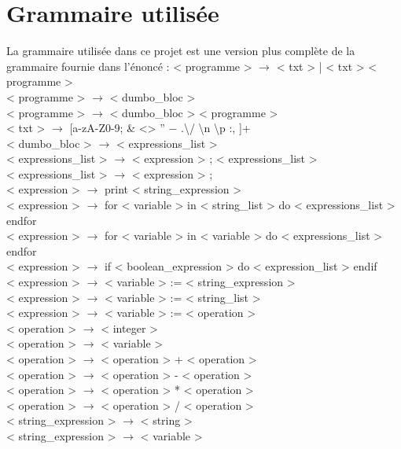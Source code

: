 \documentclass[a4paper,10pt]{article}
\begin{document}
\section{Grammaire utilisée}
La grammaire utilisée dans ce projet est une version plus complète de la grammaire fournie dans l'énoncé :\newline
{\small
< programme > $\rightarrow$ < txt > | < txt > < programme >\\
< programme > $\rightarrow$ < dumbo\_bloc > \\
< programme > $\rightarrow$ < dumbo\_bloc > < programme > \\
< txt > $\rightarrow$ [a-zA-Z0-9; \& <> ” − .\textbackslash / \textbackslash n \textbackslash p :, ]+ \\
< dumbo\_bloc > $\rightarrow$ {{ < expressions\_list > }} \\
< expressions\_list > $\rightarrow$ < expression > ; < expressions\_list >\\
< expressions\_list > $\rightarrow$ < expression > ; \\
< expression > $\rightarrow$ print < string\_expression > \\
< expression > $\rightarrow$ for < variable > in < string\_list > do < expressions\_list > endfor \\
< expression > $\rightarrow$ for < variable > in < variable > do < expressions\_list > endfor \\
< expression > $\rightarrow$ if < boolean\_expression > do < expression\_list > endif\\
< expression > $\rightarrow$ < variable > := < string\_expression > \\
< expression > $\rightarrow$ < variable > := < string\_list > \\
< expression > $\rightarrow$ < variable > := < operation > \\
< operation > $\rightarrow$ < integer > \\
< operation > $\rightarrow$ < variable > \\
< operation > $\rightarrow$ < operation > + < operation >\\
< operation > $\rightarrow$ < operation > - < operation >\\
< operation > $\rightarrow$ < operation > * < operation >\\
< operation > $\rightarrow$ < operation > / < operation >\\
< string\_expression > $\rightarrow$ < string > \\
< string\_expression > $\rightarrow$ < variable > \\
}
\end{document}
